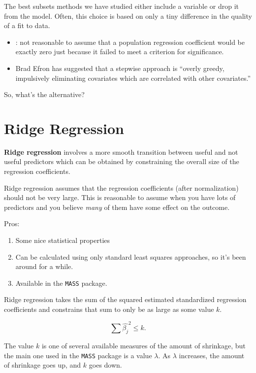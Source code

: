\documentclass[]{book}
\providecommand{\tightlist}{%
  \setlength{\itemsep}{0pt}\setlength{\parskip}{0pt}}
\theoremstyle{definition}
\theoremstyle{definition}
\theoremstyle{definition}
\theoremstyle{remark}
\begin{document}
The best subsets methods we have studied either include a variable or
drop it from the model. Often, this choice is based on only a tiny
difference in the quality of a fit to data.

\begin{itemize}
\tightlist
\item
  \citet{Harrell2001}: not reasonable to assume that a population
  regression coefficient would be exactly zero just because it failed to
  meet a criterion for significance.
\item
  Brad Efron has suggested that a stepwise approach is ``overly greedy,
  impulsively eliminating covariates which are correlated with other
  covariates.''
\end{itemize}

So, what's the alternative?

\section{Ridge Regression}\label{ridge-regression}

\textbf{Ridge regression} involves a more smooth transition between
useful and not useful predictors which can be obtained by constraining
the overall size of the regression coefficients.

Ridge regression assumes that the regression coefficients (after
normalization) should not be very large. This is reasonable to assume
when you have lots of predictors and you believe \emph{many} of them
have some effect on the outcome.

Pros:

\begin{enumerate}
\def\labelenumi{\arabic{enumi}.}
\tightlist
\item
  Some nice statistical properties
\item
  Can be calculated using only standard least squares approaches, so
  it's been around for a while.
\item
  Available in the \texttt{MASS} package.
\end{enumerate}

Ridge regression takes the sum of the squared estimated standardized
regression coefficients and constrains that sum to only be as large as
some value \(k\).

\[
\sum \hat{\beta_j}^2 \leq k.
\]

The value \(k\) is one of several available measures of the amount of
shrinkage, but the main one used in the \texttt{MASS} package is a value
\(\lambda\). As \(\lambda\) increases, the amount of shrinkage goes up,
and \(k\) goes down.
\end{document}
